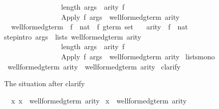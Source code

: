 \begin{isabellebody}
\ \ \ \ \ \ \ \ \ \ \ \ \ \ \ \ length\ args\ {\isacharequal}\ arity\ f{\isasymrbrakk}\isanewline
\ \ \ \ \ \ \ \ \ \ \ \ \ \ \ {\isasymLongrightarrow}\ {\isacharparenleft}Apply\ f\ args{\isacharparenright}\ {\isasymin}\ well{\isacharunderscore}formed{\isacharunderscore}gterm\ arity{\isachardoublequoteclose}\isanewline
\isanewline
\isanewline
{}\isamarkupfalse%
\isanewline
\ \ well{\isacharunderscore}formed{\isacharunderscore}gterm{\isacharprime}\ {\isacharcolon}{\isacharcolon}\ {\isachardoublequoteopen}{\isacharparenleft}{\isacharprime}f\ {\isasymRightarrow}\ nat{\isacharparenright}\ {\isasymRightarrow}\ {\isacharprime}f\ gterm\ set{\isachardoublequoteclose}\isanewline
\ \ \ arity\ {\isacharcolon}{\isacharcolon}\ {\isachardoublequoteopen}{\isacharprime}f\ {\isasymRightarrow}\ nat{\isachardoublequoteclose}\isanewline
{}\isanewline
step{\isacharbrackleft}intro{\isacharbang}{\isacharbrackright}{\isacharcolon}\ {\isachardoublequoteopen}{\isasymlbrakk}args\ {\isasymin}\ lists\ {\isacharparenleft}well{\isacharunderscore}formed{\isacharunderscore}gterm{\isacharprime}\ arity{\isacharparenright}{\isacharsemicolon}\ \ \isanewline
\ \ \ \ \ \ \ \ \ \ \ \ \ \ \ \ length\ args\ {\isacharequal}\ arity\ f{\isasymrbrakk}\isanewline
\ \ \ \ \ \ \ \ \ \ \ \ \ \ \ {\isasymLongrightarrow}\ {\isacharparenleft}Apply\ f\ args{\isacharparenright}\ {\isasymin}\ well{\isacharunderscore}formed{\isacharunderscore}gterm{\isacharprime}\ arity{\isachardoublequoteclose}\isanewline
{}\ lists{\isacharunderscore}mono\isanewline
\isanewline
{}\isamarkupfalse%
\ {\isachardoublequoteopen}well{\isacharunderscore}formed{\isacharunderscore}gterm\ arity\ {\isasymsubseteq}\ well{\isacharunderscore}formed{\isacharunderscore}gterm{\isacharprime}\ arity{\isachardoublequoteclose}\isanewline
%
\isadelimproof
%
\endisadelimproof
%
\isatagproof
{}\isamarkupfalse%
\ clarify%
\begin{isamarkuptxt}%
The situation after clarify
\begin{isabelle}%
\ {}{\isachardot}\ {\isasymAnd}x{\isachardot}\ x\ {\isasymin}\ well{\isacharunderscore}formed{\isacharunderscore}gterm\ arity\ {\isasymLongrightarrow}\isanewline
{}x\ {\isasymin}\ well{\isacharunderscore}formed{\isacharunderscore}gterm{\isacharprime}\ arity%
\end{isabelle}%
\end{isamarkuptxt}%
\isamarkuptrue%

\end{isabellebody}
